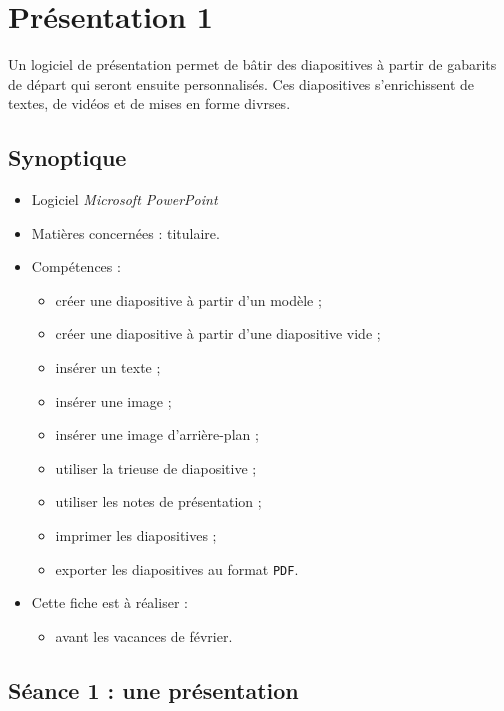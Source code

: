 \chapter{Présentation 1}  

Un logiciel de présentation permet de bâtir des diapositives à partir de gabarits de départ qui seront ensuite personnalisés. Ces diapositives s'enrichissent de textes, de vidéos et de mises en forme divrses.

\section*{Synoptique}

{\footnotesize
\begin{itemize}
\item Logiciel \emph{Microsoft PowerPoint} 
\item Matières concernées : titulaire.
\item Compétences : 
        \begin{itemize}
        \item créer une diapositive à partir d'un modèle ; 
	\item créer une diapositive à partir d'une diapositive vide ;
	\item insérer un texte ;
	\item insérer une image ;
	\item insérer une image d'arrière-plan ;
	\item utiliser la trieuse de diapositive ;
	\item utiliser les notes de présentation ;
	\item imprimer les diapositives ;
	\item exporter les diapositives au format \texttt{PDF}.
        \end{itemize}
\item Cette fiche est à réaliser :
        \begin{itemize}
        \item avant les vacances de février. 
        \end{itemize}
\end{itemize}
}%


\vfill
\phantom{rien}

%
%
%
%

\pagebreak

\section{Séance 1 : une présentation}\label{fichePresentation6e1}

